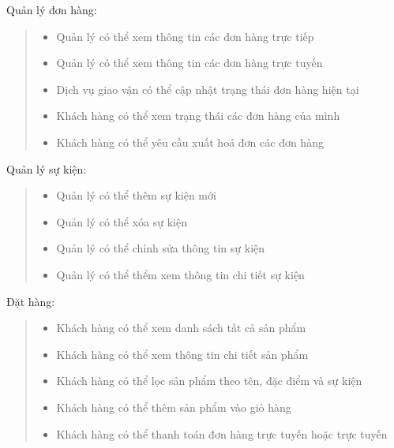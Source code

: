         Quản lý đơn hàng:
        \begin{quote}
            \begin{itemize}
                \item Quản lý có thể xem thông tin các đơn hàng trực tiếp
                \item Quản lý có thể xem thông tin các đơn hàng trực tuyến
                \item Dịch vụ giao vận có thể cập nhật trạng thái đơn hàng hiện tại
                \item Khách hàng có thể xem trạng thái các đơn hàng của mình
                \item Khách hàng có thể yêu cầu xuất hoá đơn các đơn hàng
            \end{itemize}
        \end{quote}
        
        Quản lý sự kiện:
        \begin{quote}
            \begin{itemize}
                \item Quản lý có thể thêm sự kiện mới
                \item Quản lý có thể xóa sự kiện
                \item Quản lý có thể chỉnh sửa thông tin sự kiện
                \item Quản lý có thể thểm xem thông tin chi tiết sự kiện
            \end{itemize}
        \end{quote}
       
        Đặt hàng:
        \begin{quote}
            \begin{itemize}
                \item Khách hàng có thể xem danh sách tất cả sản phẩm
                \item Khách hàng có thể xem thông tin chi tiết sản phẩm
                \item Khách hàng có thể lọc sản phẩm theo tên, đặc điểm và sự kiện
                \item Khách hàng có thể thêm sản phẩm vào giỏ hàng
                \item Khách hàng có thể thanh toán đơn hàng trực tuyến hoặc trực tuyến
            \end{itemize}
        \end{quote}
    
